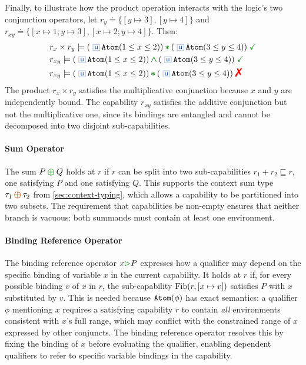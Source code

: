 \begin{example}
Finally, to illustrate how the product operation interacts with the
logic's two conjunction operators, let
$r_y \doteq \{[y \mapsto 3], [y \mapsto 4]\}$ and
$r_{xy} \doteq \{[x \mapsto 1; y \mapsto 3], [x \mapsto 2; y \mapsto
4]\}$.  Then:
\vspace{-0.2em}
\begin{align*}
&r_x \times r_y \models (\angelic\,\Code{Atom}(1 \leq x \leq 2)) \chstar (\angelic\,\Code{Atom}(3 \leq y \leq 4)) \;\judgok \\
&r_{xy} \models (\angelic\,\Code{Atom}(1 \leq x \leq 2)) \chland (\angelic\,\Code{Atom}(3 \leq y \leq 4)) \;\judgok \\
&r_{xy} \models (\angelic\,\Code{Atom}(1 \leq x \leq 2)) \chstar (\angelic\,\Code{Atom}(3 \leq y \leq 4)) \;\judgfail
\end{align*}
The product $r_x \times r_y$ satisfies the multiplicative conjunction
because $x$ and $y$ are independently bound.  The capability $r_{xy}$
satisfies the additive conjunction but not the multiplicative one,
since its bindings are entangled and cannot be decomposed into two
disjoint sub-capabilities.

\end{example}

\paragraph{Sum Operator}
The sum $P \choplus Q$ holds at $r$ if $r$ can be split into two
sub-capabilities $r_1 + r_2 \sqsubseteq r$, one satisfying $P$ and one
satisfying $Q$.  This supports the context sum type
$\tau_1 \ctoplus \tau_2$ from \autoref{sec:context-typing}, which
allows a capability to be partitioned into two subsets. The requirement
that capabilities be non-empty ensures that neither branch is vacuous:
both summands must contain at least one environment.

\paragraph{Binding Reference Operator}
The binding reference operator $\forallM{x} P$ expresses how a
qualifier may depend on the specific binding of variable $x$ in the
current capability.  It holds at $r$ if, for every possible binding
$v$ of $x$ in $r$, the sub-capability $\operatorname{Fib}(r,[x \mapsto v])$
satisfies $P$ with $x$ substituted by $v$.  This is needed because
${\tt Atom}(\phi)$ has exact semantics: a qualifier $\phi$ mentioning
$x$ requires a satisfying capability $r$ to contain \emph{all}
environments consistent with $x$'s full range, which may conflict with
the constrained range of $x$ expressed by other conjuncts.  The
binding reference operator resolves this by fixing the binding of $x$
before evaluating the qualifier, enabling dependent qualifiers to
refer to specific variable bindings in the capability.

